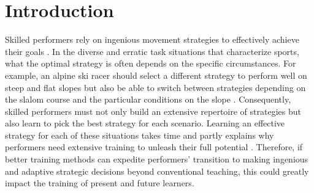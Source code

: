 \documentclass[pdflatex,sn-nature]{sn-jnl}%
\theoremstyle{thmstyleone}%
\theoremstyle{thmstyletwo}%
\theoremstyle{thmstylethree}%
\begin{document}
\section{Introduction}
Skilled performers rely on ingenious movement strategies to effectively achieve their goals  \cite{krakauer_motor_2019,wolpert_motor_2010, wolpert_principles_2011, gray_plateaus_2017, diedrichsen_motor_2015, chen_effects_2018, stanley_motor_2013, du_relationship_2022, mangalam_investigating_2023, taylor_role_2012, tsay_strategy_2023}. In the diverse and erratic task situations that characterize sports, what the optimal strategy is often depends on the specific circumstances. For example, an alpine ski racer should select a different strategy to perform well on steep and flat slopes \cite{supej_impact_2015} but also be able to switch between strategies depending on the slalom course and the particular conditions on the slope \cite{reid_kinematic_2010}. Consequently, skilled performers must not only build an extensive repertoire of strategies but also learn to pick the best strategy for each scenario\cite{krakauer_motor_2019, du_relationship_2022,mangalam_investigating_2023,wolpert_principles_2011, gallivan_decision-making_2018}. Learning an effective strategy for each of these situations takes time and partly explains why performers need extensive training to unleash their full potential \cite{krakauer_motor_2019}. Therefore, if better training methods can expedite performers' transition to making ingenious and adaptive strategic decisions beyond conventional teaching, this could greatly impact the training of present and future learners.

\end{document}
